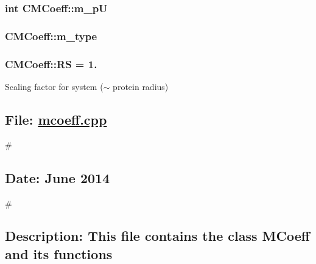 \hypertarget{classCMCoeff_ac00d5938d669575bf71826ee725ccf46}{
\subsubsection[{m\-\_\-p\-U}]{\setlength{\rightskip}{0pt plus 5cm}int C\-M\-Coeff\-::m\-\_\-p\-U\hspace{0.3cm}{\ttfamily [protected]}}}\label{classCMCoeff_ac00d5938d669575bf71826ee725ccf46}
\hypertarget{classCMCoeff_afe0cd2c61d33f32a058302fb53c33ccf}{
\subsubsection[{m\-\_\-type}]{ C\-M\-Coeff\-::m\-\_\-type\hspace{0.3cm}{\ttfamily [protected]}}}\label{classCMCoeff_afe0cd2c61d33f32a058302fb53c33ccf}
\hypertarget{classCMCoeff_a512caa3ff1994cbde85011489b8f34ce}{
\subsubsection[{R\-S}]{ C\-M\-Coeff\-::\-R\-S = 1.\hspace{0.3cm}{\ttfamily [static]}}}\label{classCMCoeff_a512caa3ff1994cbde85011489b8f34ce}


Scaling factor for system ($\sim$ protein radius) 

\subsection*{File\-: \hyperlink{mcoeff_8cpp}{mcoeff.\-cpp}}

\# \subsection*{Date\-: June 2014}

\# \subsection*{Description\-: This file contains the class M\-Coeff and its functions}

